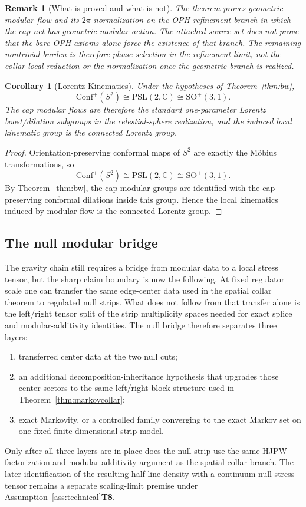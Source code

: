 \documentclass[11pt]{article}
\newtheorem{corollary}[theorem]{Corollary}
\newtheorem{remark}[theorem]{Remark}
\newcommand{\Conf}{\mathrm{Conf}}
\begin{document}
\begin{remark}[What is proved and what is not]
The theorem proves geometric modular flow and its \(2\pi\) normalization \emph{on the OPH refinement branch in which the cap net has geometric modular action}. The attached source set does not prove that the bare OPH axioms alone force the existence of that branch. The remaining nontrivial burden is therefore phase selection in the refinement limit, not the collar-local reduction or the normalization once the geometric branch is realized.
\end{remark}

\begin{corollary}[Lorentz Kinematics]\label{cor:lorentz}
Under the hypotheses of Theorem~\ref{thm:bw},
\[
\Conf^+(S^2)\cong \mathrm{PSL}(2,\mathbb C)\cong \mathrm{SO}^+(3,1).
\]
The cap modular flows are therefore the standard one-parameter Lorentz boost/dilation subgroups in the celestial-sphere realization, and the induced local kinematic group is the connected Lorentz group.
\end{corollary}

\begin{proof}
Orientation-preserving conformal maps of \(S^2\) are exactly the M\"obius transformations, so
\[
\Conf^+(S^2)\cong \mathrm{PSL}(2,\mathbb C)\cong \mathrm{SO}^+(3,1).
\]
By Theorem~\ref{thm:bw}, the cap modular groups are identified with the cap-preserving conformal dilations inside this group. Hence the local kinematics induced by modular flow is the connected Lorentz group.
\end{proof}

\subsection{The null modular bridge}

The gravity chain still requires a bridge from modular data to a local stress tensor, but the sharp claim boundary is now the following. At fixed regulator scale one can transfer the same edge-center data used in the spatial collar theorem to regulated null strips. What does not follow from that transfer alone is the left/right tensor split of the strip multiplicity spaces needed for exact splice and modular-additivity identities. The null bridge therefore separates three layers:
\begin{enumerate}[leftmargin=2em]
\item transferred center data at the two null cuts;
\item an additional decomposition-inheritance hypothesis that upgrades those center sectors to the same left/right block structure used in Theorem~\ref{thm:markovcollar};
\item exact Markovity, or a controlled family converging to the exact Markov set on one fixed finite-dimensional strip model.
\end{enumerate}
Only after all three layers are in place does the null strip use the same HJPW factorization and modular-additivity argument as the spatial collar branch. The later identification of the resulting half-line density with a continuum null stress tensor remains a separate scaling-limit premise under Assumption~\ref{ass:technical}\textbf{T8}.
\end{document}
